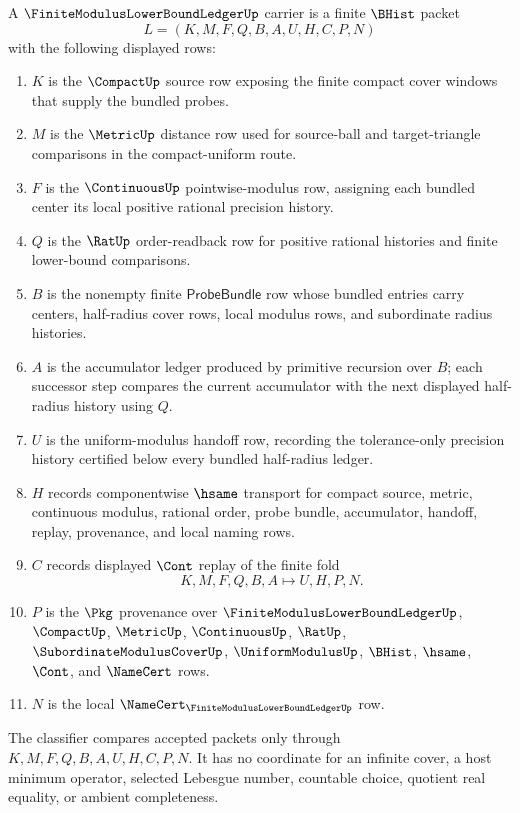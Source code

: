 \begin{definition}
\label{def:finite-modulus-lower-bound-ledger-carrier}
A $\FiniteModulusLowerBoundLedgerUp$ carrier is a finite $\BHist$ packet
$$
L=(K,M,F,Q,B,A,U,H,C,P,N)
$$
with the following displayed rows:
\begin{enumerate}
\item $K$ is the $\CompactUp$ source row exposing the finite compact cover windows that supply the bundled probes.
\item $M$ is the $\MetricUp$ distance row used for source-ball and target-triangle comparisons in the compact-uniform route.
\item $F$ is the $\ContinuousUp$ pointwise-modulus row, assigning each bundled center its local positive rational precision history.
\item $Q$ is the $\RatUp$ order-readback row for positive rational histories and finite lower-bound comparisons.
\item $B$ is the nonempty finite $\mathsf{ProbeBundle}$ row whose bundled entries carry centers, half-radius cover rows, local modulus rows, and subordinate radius histories.
\item $A$ is the accumulator ledger produced by primitive recursion over $B$; each successor step compares the current accumulator with the next displayed half-radius history using $Q$.
\item $U$ is the uniform-modulus handoff row, recording the tolerance-only precision history certified below every bundled half-radius ledger.
\item $H$ records componentwise $\hsame$ transport for compact source, metric, continuous modulus, rational order, probe bundle, accumulator, handoff, replay, provenance, and local naming rows.
\item $C$ records displayed $\Cont$ replay of the finite fold
$$
K,M,F,Q,B,A \longmapsto U,H,P,N .
$$
\item $P$ is the $\Pkg$ provenance over $\FiniteModulusLowerBoundLedgerUp$, $\CompactUp$, $\MetricUp$, $\ContinuousUp$, $\RatUp$, $\SubordinateModulusCoverUp$, $\UniformModulusUp$, $\BHist$, $\hsame$, $\Cont$, and $\NameCert$ rows.
\item $N$ is the local $\NameCert_{\FiniteModulusLowerBoundLedgerUp}$ row.
\end{enumerate}
The classifier compares accepted packets only through $K,M,F,Q,B,A,U,H,C,P,N$. It has no coordinate for an infinite cover, a host minimum operator, selected Lebesgue number, countable choice, quotient real equality, or ambient completeness.
\end{definition}

